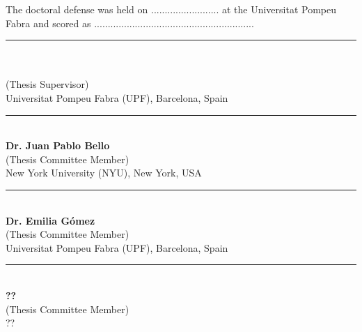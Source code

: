 
\newcommand\advisor[2]{
	\vspace{1.3cm}
	\begin{center}
		\rule{6cm}{0.8pt}\\
		\textbf{#1}\\
		(Thesis Supervisor)\\
		#2
	\end{center}
}
\newcommand\member[2]{
	\vspace{1.3cm}
	\begin{center}
		\rule{6cm}{0.8pt}\\
		\textbf{#1}\\
		(Thesis Committee Member) \\
		#2
	\end{center}
} 

\vspace{1cm}
\noindent The doctoral defense was held on ......................... at the Universitat Pompeu Fabra and scored as ...........................................................\par
\vspace{2cm}
\advisor{\supervisor}{Universitat Pompeu Fabra (UPF), Barcelona, Spain}
\vspace*{0.3cm}

\member{Dr. Juan Pablo Bello}{New York University (NYU), New York, USA}
\member{Dr. Emilia G{\'o}mez}{Universitat Pompeu Fabra (UPF), Barcelona, Spain}
\member{??}{??}